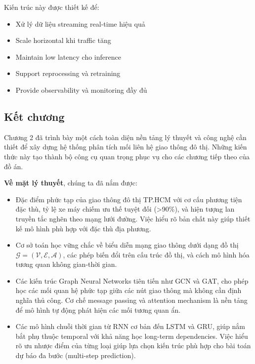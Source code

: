 Kiến trúc này được thiết kế để:
\begin{itemize}
    \item Xử lý dữ liệu streaming real-time hiệu quả
    \item Scale horizontal khi traffic tăng
    \item Maintain low latency cho inference
    \item Support reprocessing và retraining
    \item Provide observability và monitoring đầy đủ
\end{itemize}


\newpage
\subsection{Kết chương}

Chương 2 đã trình bày một cách toàn diện nền tảng lý thuyết và công nghệ cần thiết để xây dựng hệ thống phân tích mối liên hệ giao thông đô thị. Những kiến thức này tạo thành bộ công cụ quan trọng phục vụ cho các chương tiếp theo của đồ án.

\textbf{Về mặt lý thuyết}, chúng ta đã nắm được:

\begin{itemize}
    \item Đặc điểm phức tạp của giao thông đô thị TP.HCM với cơ cấu phương tiện đặc thù, tỷ lệ xe máy chiếm ưu thế tuyệt đối (>90\%), và hiện tượng lan truyền tắc nghẽn theo mạng lưới đường. Việc hiểu rõ bản chất này giúp thiết kế mô hình phù hợp với đặc thù địa phương.

    \item Cơ sở toán học vững chắc về biểu diễn mạng giao thông dưới dạng đồ thị $\mathcal{G} = (\mathcal{V}, \mathcal{E}, \mathcal{A})$, các phép biến đổi trên cấu trúc đồ thị, và cách mô hình hóa tương quan không gian-thời gian.   

    \item Các kiến trúc Graph Neural Networks tiên tiến như GCN và GAT, cho phép học các mối quan hệ phức tạp giữa các nút giao thông mà không cần định nghĩa thủ công. Cơ chế message passing và attention mechanism là nền tảng để mô hình tự động phát hiện các mối tương quan ẩn.

    \item Các mô hình chuỗi thời gian từ RNN cơ bản đến LSTM và GRU, giúp nắm bắt phụ thuộc temporal với khả năng học long-term dependencies. Việc hiểu rõ ưu nhược điểm của từng loại giúp lựa chọn kiến trúc phù hợp cho bài toán dự báo đa bước (multi-step prediction).
\end{itemize}

